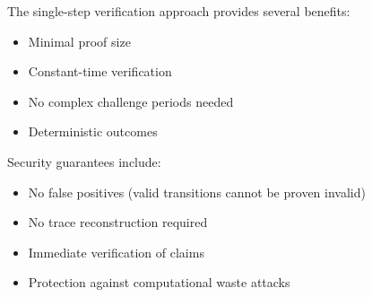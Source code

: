 \documentclass[../midgard.tex]{subfiles}
\begin{document}
The single-step verification approach provides several benefits:

\begin{itemize}
    \item Minimal proof size
    \item Constant-time verification
    \item No complex challenge periods needed
    \item Deterministic outcomes
\end{itemize}

Security guarantees include:

\begin{itemize}
    \item No false positives (valid transitions cannot be proven invalid)
    \item No trace reconstruction required
    \item Immediate verification of claims
    \item Protection against computational waste attacks
\end{itemize}
\end{document}
